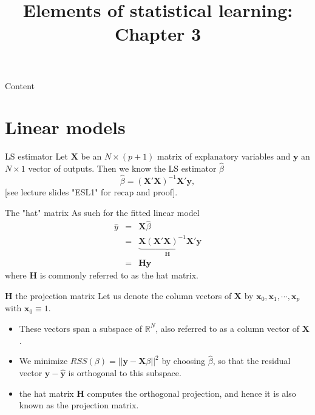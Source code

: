 \documentclass{beamer}
\title{Elements of statistical learning:
Chapter 3}
\newcommand{\R}{\mathbb{R}}
\begin{document}
\maketitle

\begin{frame}{Content}
\tableofcontents
\end{frame}

\section{Linear models}

\begin{frame}{LS estimator}
Let $\bm{X}$ be an $N\times(p+1)$ matrix of explanatory variables and $\bm{y}$ an $N\times 1$ vector of outputs. Then we know the LS estimator $\hat{\beta}$
\[
\hat{\beta}=(\bm{X}'\bm{X})^{-1}\bm{X}'\bm{y},
\]
 [see lecture slides "ESL1" for recap and proof]. 
\begin{block}{The "hat" matrix}
As such for the fitted linear model
\begin{eqnarray*}
\hat{y}&=&\bm{X}\hat{\beta}\\
&=&\underbrace{\bm{X}(\bm{X}'\bm{X})^{-1}\bm{X}'}_{\bm{H}}\bm{y}\\
&=&\bm{H}\bm{y}
\end{eqnarray*}
where $\bm{H}$ is commonly referred to as the hat matrix.
\end{block}
\end{frame}

\begin{frame}{$\bm{H}$ the projection matrix}
Let us denote the column vectors of $\bm{X}$ by $\bm{x}_0,\bm{x}_1,\cdots,\bm{x}_p$ with $\bm{x}_0\equiv 1$.
\begin{itemize}
\item{} These vectors span a subspace of $\R^N$, also referred to as a column vector of $\bm{X}$.
\item{} We minimize $RSS(\beta)=\lvert\lvert \bm{y}-\bm{X}\beta\rvert\rvert^2$ by choosing $\hat{\beta}$, so that the residual vector $\bm{y}-\hat{\bm{y}}$ is orthogonal to this subspace.
\item{} the hat matrix $\bm{H}$ computes the orthogonal projection, and hence it is also known as the projection matrix.
\end{itemize}
\end{frame}
\end{document}

